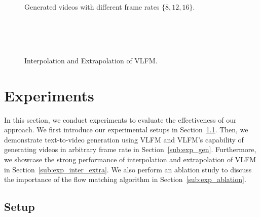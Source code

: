 \begin{figure*}[!ht]
\begin{center}
\centering
     \\
\end{center}
\caption{Generated videos with different frame rates $\{8, 12, 16\}$. }
\label{fig:gen}
\ifdefined\isarxiv
\else
\vspace{-3mm}
\fi
\end{figure*}

\begin{figure*}[!ht]
\begin{center}
\centering
     \\
     \\
     \\
\end{center}
\caption{Interpolation and Extrapolation of VLFM.}
\label{fig:inter_extra}
\ifdefined\isarxiv
\else
\vspace{-2mm}
\fi
\end{figure*}

\section{Experiments}\label{sec:exp}

In this section, we conduct experiments to evaluate the effectiveness of our approach. We first introduce our experimental setups in Section~\ref{sub:exp_setup}. Then, we demonstrate text-to-video generation using VLFM and VLFM's capability of generating videos in arbitrary frame rate in Section~\ref{sub:exp_gen}. Furthermore, we showcase the strong performance of interpolation and extrapolation of VLFM in Section~\ref{sub:exp_inter_extra}. We also perform an ablation study to discuss the importance of the flow matching algorithm in Section~\ref{sub:exp_ablation}.

\subsection{Setup} \label{sub:exp_setup}


